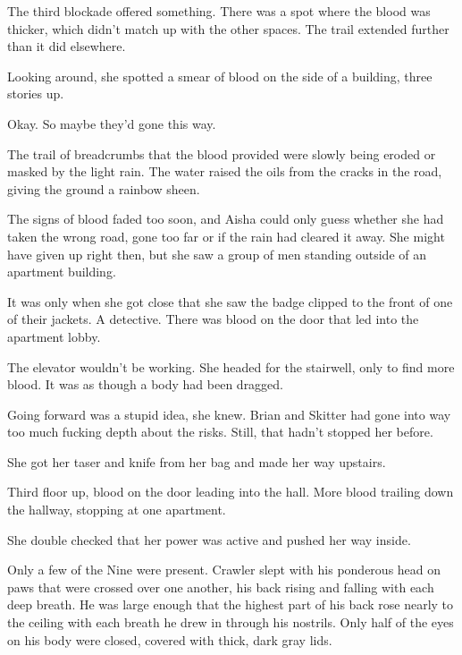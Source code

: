 The third blockade offered something.  There was a spot where the blood was thicker, which didn't match up with the other spaces.  The trail extended further than it did elsewhere.



Looking around, she spotted a smear of blood on the side of a building, three stories up.



Okay.  So maybe they'd gone this way.



The trail of breadcrumbs that the blood provided were slowly being eroded or masked by the light rain.  The water raised the oils from the cracks in the road, giving the ground a rainbow sheen.



The signs of blood faded too soon, and Aisha could only guess whether she had taken the wrong road, gone too far or if the rain had cleared it away.  She might have given up right then, but she saw a group of men standing outside of an apartment building.



It was only when she got close that she saw the badge clipped to the front of one of their jackets.  A detective.  There was blood on the door that led into the apartment lobby.



The elevator wouldn't be working.  She headed for the stairwell, only to find more blood.  It was as though a body had been dragged.



Going forward was a stupid idea, she knew.  Brian and Skitter had gone into way too much fucking depth about the risks.   Still, that hadn't stopped her before.



She got her taser and knife from her bag and made her way upstairs.



Third floor up, blood on the door leading into the hall.  More blood trailing down the hallway, stopping at one apartment.



She double checked that her power was active and pushed her way inside.



Only a few of the Nine were present.  Crawler slept with his ponderous head on paws that were crossed over one another, his back rising and falling with each deep breath.  He was large enough that the highest part of his back rose nearly to the ceiling with each breath he drew in through his nostrils.  Only half of the eyes on his body were closed, covered with thick, dark gray lids.



